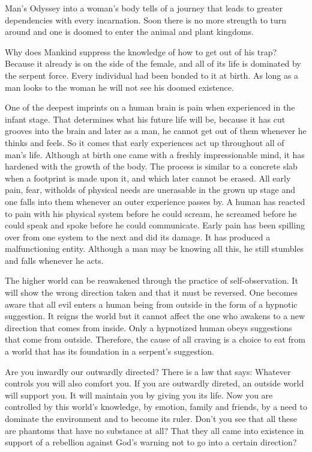 \documentclass[landscape,twocolumn,letterpaper]{article}
\begin{document}
Man's Odyssey into a woman's body tells of a journey that leads to
greater dependencies with every incarnation. Soon there is no more
strength to turn around and one is doomed to enter the animal and
plant kingdoms.

Why does Mankind suppress the knowledge of how to get out of his trap? 
Because it already is on the side of the female, and all of its life
is dominated by the serpent force. Every individual had been bonded to
it at birth. As long as a man looks to the woman he will not see his
doomed existence.

One of the deepest imprints on a human brain is pain when experienced
in the infant stage. That determines what his future life will be,
because it has cut grooves into the brain and later as a man, he
cannot get out of them whenever he thinks and feels. So it comes that
early experiences act up throughout all of man's life. Although at
birth one came with a freshly impressionable mind, it has hardened
with the growth of the body. The process is similar to a concrete slab
when a footprint is made upon it, and which later cannot be
erased. All early pain, fear, witholds of physical needs are
unerasable in the grown up stage and one falls into them whenever an
outer experience passes by.  A human has reacted to pain with his
physical system before he could scream, he screamed before he could
speak and spoke before he could communicate. Early pain has been
spilling over from one system to the next and did its damage. It has
produced a malfunctioning entity. Although a man may be knowing all
this, he still stumbles and falls whenever he acts.

The higher world can be reawakened through the practice of
self-observation.  It will show the wrong direction taken and that it
must be reversed. One becomes aware that all evil enters a human being
from outside in the form of a hypnotic suggestion. It reigns the world
but it cannot affect the one who awakens to a new direction that comes
from inside. Only a hypnotized human obeys suggestions that come from
outside. Therefore, the cause of all craving is a choice to eat from a
world that has its foundation in a serpent's suggestion.

Are you inwardly our outwardly directed? There is a law that says:
Whatever controls you will also comfort you. If you are outwardly
direted, an outside world will support you. It will maintain you by
giving you its life. Now you are controlled by this world's knowledge,
by emotion, family and friends, by a need to dominate the environment
and to become its ruler. Don't you see that all these are phantoms
that have no substance at all? That they all came into existence in
support of a rebellion against God's warning not to go into a certain
direction?
\end{document}
